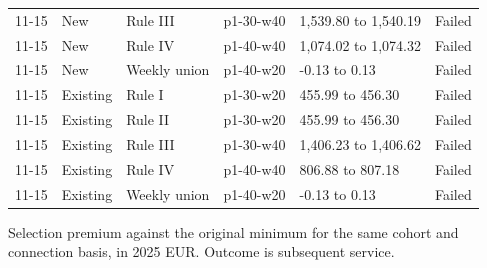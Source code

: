\begin{minipage}{\linewidth}
{\begin{tabular}{llllll}
11-15 & New & Rule III & p1-30-w40 & 1,539.80 to 1,540.19 & Failed \\
11-15 & New & Rule IV & p1-40-w40 & 1,074.02 to 1,074.32 & Failed \\
11-15 & New & Weekly union & p1-40-w20 & -0.13 to 0.13 & Failed \\
11-15 & Existing & Rule I & p1-30-w20 & 455.99 to 456.30 & Failed \\
11-15 & Existing & Rule II & p1-30-w20 & 455.99 to 456.30 & Failed \\
11-15 & Existing & Rule III & p1-30-w40 & 1,406.23 to 1,406.62 & Failed \\
11-15 & Existing & Rule IV & p1-40-w40 & 806.88 to 807.18 & Failed \\
11-15 & Existing & Weekly union & p1-40-w20 & -0.13 to 0.13 & Failed \\
\bottomrule
\end{tabular}}%
\ifdim\wd0>\linewidth\resizebox{\linewidth}{!}{\usebox0}\else\usebox0\fi
\par\smallskip\footnotesize Selection premium against the original minimum for the same cohort and connection basis, in 2025 EUR. Outcome is subsequent service.
\end{minipage}
